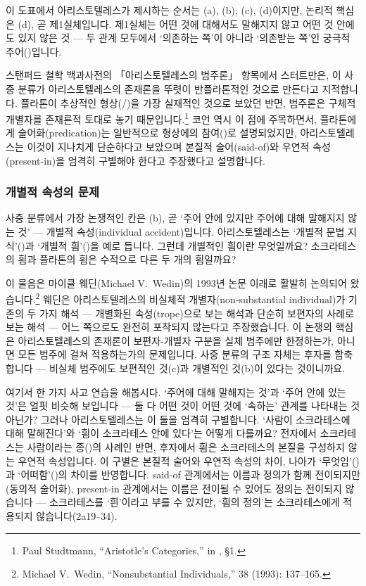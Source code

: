 \documentclass[12pt, a4paper]{article}
\begin{document}
이 도표에서 아리스토텔레스가 제시하는 순서는 (a), (b), (c), (d)이지만, 논리적 핵심은 (d), 곧 제1실체입니다. 제1실체는 어떤 것에 대해서도 말해지지 않고 어떤 것 안에도 있지 않은 것 --- 두 관계 모두에서 `의존하는 쪽'이 아니라 `의존받는 쪽'인 궁극적 주어()입니다.

스탠퍼드 철학 백과사전의 「아리스토텔레스의 범주론」 항목에서 스터트만은, 이 사중 분류가 아리스토텔레스의 존재론을 뚜렷이 반플라톤적인 것으로 만든다고 지적합니다. 플라톤이 추상적인 형상(/)을 가장 실재적인 것으로 보았던 반면, 범주론은 구체적 개별자를 존재론적 토대로 놓기 때문입니다.\footnote{Paul Studtmann, ``Aristotle's Categories,'' in , §1.} 코언 역시 이 점에 주목하면서, 플라톤에게 술어화(predication)는 일반적으로 형상에의 참여()로 설명되었지만, 아리스토텔레스는 이것이 지나치게 단순하다고 보았으며 본질적 술어(said-of)와 우연적 속성(present-in)을 엄격히 구별해야 한다고 주장했다고 설명합니다.

\subsubsection{개별적 속성의 문제}

사중 분류에서 가장 논쟁적인 칸은 (b), 곧 `주어 안에 있지만 주어에 대해 말해지지 않는 것' --- 개별적 속성(individual accident)입니다. 아리스토텔레스는 `개별적 문법 지식'()과 `개별적 흼'()을 예로 듭니다. 그런데 개별적인 흼이란 무엇일까요? 소크라테스의 흼과 플라톤의 흼은 수적으로 다른 두 개의 흼일까요?

이 물음은 마이클 웨딘(Michael V.\ Wedin)의 1993년 논문 이래로 활발히 논의되어 왔습니다.\footnote{Michael V.\ Wedin, ``Nonsubstantial Individuals,''  38 (1993): 137--165.} 웨딘은 아리스토텔레스의 비실체적 개별자(non-substantial individual)가 기존의 두 가지 해석 --- 개별화된 속성(trope)으로 보는 해석과 단순히 보편자의 사례로 보는 해석 --- 어느 쪽으로도 완전히 포착되지 않는다고 주장했습니다. 이 논쟁의 핵심은 아리스토텔레스의 존재론이 보편자-개별자 구분을 실체 범주에만 한정하는가, 아니면 모든 범주에 걸쳐 적용하는가의 문제입니다. 사중 분류의 구조 자체는 후자를 함축합니다 --- 비실체 범주에도 보편적인 것(c)과 개별적인 것(b)이 있다는 것이니까요.

여기서 한 가지 사고 연습을 해봅시다. `주어에 대해 말해지는 것'과 `주어 안에 있는 것'은 얼핏 비슷해 보입니다 --- 둘 다 어떤 것이 어떤 것에 `속하는' 관계를 나타내는 것 아닌가? 그러나 아리스토텔레스는 이 둘을 엄격히 구별합니다. `사람이 소크라테스에 대해 말해진다'와 `흼이 소크라테스 안에 있다'는 어떻게 다를까요? 전자에서 소크라테스는 사람이라는 종()의 사례인 반면, 후자에서 흼은 소크라테스의 본질을 구성하지 않는 우연적 속성입니다. 이 구별은 본질적 술어와 우연적 속성의 차이, 나아가 `무엇임'()과 `어떠함'()의 차이를 반영합니다. said-of 관계에서는 이름과 정의가 함께 전이되지만(동의적 술어화), present-in 관계에서는 이름은 전이될 수 있어도 정의는 전이되지 않습니다 --- 소크라테스를 `흰'이라고 부를 수 있지만, `흼의 정의'는 소크라테스에게 적용되지 않습니다(2a19--34).
\end{document}
